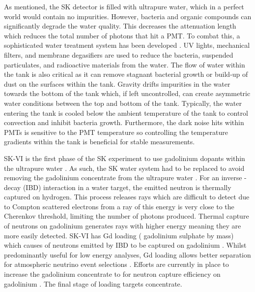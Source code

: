 As mentioned, the SK detector is filled with ultrapure water, which in a perfect world would contain no impurities. However, bacteria and organic compounds can significantly degrade the water quality. This decreases the attenuation length which reduces the total number of photons that hit a PMT. To combat this, a sophisticated water treatment system has been developed \cite{Fukuda2003-ly, Nakano2020-sb}. UV lights, mechanical filters, and membrane degasifiers are used to reduce the bacteria, suspended particulates, and radioactive materials from the water. The flow of water within the tank is also critical as it can remove stagnant bacterial growth or build-up of dust on the surfaces within the tank. Gravity drifts impurities in the water towards the bottom of the tank which, if left uncontrolled, can create asymmetric water conditions between the top and bottom of the tank.
Typically, the water entering the tank is cooled below the ambient temperature of the tank to control convection and inhibit bacteria growth. Furthermore, the dark noise hits within PMTs is sensitive to the PMT temperature \cite{HamamatsuPMT} so controlling the temperature gradients within the tank is beneficial for stable measurements.

SK-VI is the first phase of the SK experiment to use gadolinium dopants within the ultrapure water . As such, the SK water system had to be replaced to avoid removing the gadolinium concentrate from the ultrapure water \cite{Abe2022-qq}. For an inverse \quickmath{\beta}-decay (IBD) interaction in a water target, the emitted neutron is thermally captured on hydrogen. This process releases  \quickmath{\gamma} rays which are difficult to detect due to Compton scattered electrons from a \quickmath{\gamma} ray of this energy is very close to the Cherenkov threshold, limiting the number of photons produced. Thermal capture of neutrons on gadolinium generates \quickmath{\gamma} rays with higher energy meaning they are more easily detected. SK-VI has  Gd loading ( gadolinium sulphate by mass) which causes  of neutrons emitted by IBD to be captured on gadolinium\cite{PhysRevLett.93.171101,Marti2020-le} . Whilst predominantly useful for low energy analyses, Gd loading allows better \quickmath{\nu/\bar{\nu}} separation for atmospheric neutrino event selections \cite{Marti2019-gu}. Efforts are currently in place to increase the gadolinium concentrate to  for  neutron capture efficiency on gadolinium . The final stage of loading targets  concentrate.

